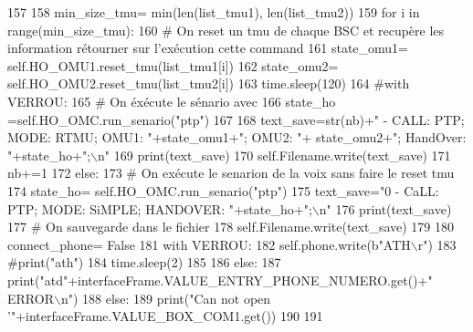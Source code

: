 \begin{DoxyCode}
157 
158                             min\_size\_tmu= min(len(list\_tmu1), len(list\_tmu2))
159                             \textcolor{keywordflow}{for} i \textcolor{keywordflow}{in} range(min\_size\_tmu):
160                                 \textcolor{comment}{# On reset un tmu de chaque BSC et recupère les information rétourner sur
       l'exécution cette command
}
161                                 state\_omu1= self.HO\_OMU1.reset\_tmu(list\_tmu1[i])
162                                 state\_omu2= self.HO\_OMU2.reset\_tmu(list\_tmu2[i])
163                                 time.sleep(120)
164                                 \textcolor{comment}{#with VERROU:
}
165                                 \textcolor{comment}{# On éxécute le sénario avec
}
166                                 state\_ho =self.HO\_OMC.run\_senario(\textcolor{stringliteral}{"ptp"})
167                                 
168                                 text\_save=str(nb)+\textcolor{stringliteral}{" - CALL: PTP; MODE: RTMU; OMU1: "}+state\_omu1+\textcolor{stringliteral}{"; OMU2: "}+
      state\_omu2+\textcolor{stringliteral}{"; HandOver: "}+state\_ho+\textcolor{stringliteral}{";\(\backslash\)n"}
169                                 print(text\_save)
170                                 self.Filename.write(text\_save)
171                             nb+=1
172                     \textcolor{keywordflow}{else}:
173                         \textcolor{comment}{# On exécute le senarion de la voix sans faire le reset tmu
}
174                         state\_ho= self.HO\_OMC.run\_senario(\textcolor{stringliteral}{"ptp"})
175                         text\_save=\textcolor{stringliteral}{"0 - CaLL: PTP; MODE: SiMPLE; HANDOVER: "}+state\_ho+\textcolor{stringliteral}{";\(\backslash\)n"}
176                         print(text\_save)
177                         \textcolor{comment}{# On sauvegarde dans le fichier
}
178                         self.Filename.write(text\_save)
179 
180                     connect\_phone= \textcolor{keyword}{False}
181                     with VERROU:
182                         self.phone.write(b\textcolor{stringliteral}{"ATH\(\backslash\)r"})
183                         \textcolor{comment}{#print("ath")
}
184                     time.sleep(2)
185 
186             \textcolor{keywordflow}{else}:
187                 print(\textcolor{stringliteral}{"atd"}+interfaceFrame.VALUE\_ENTRY\_PHONE\_NUMERO.get()+\textcolor{stringliteral}{" ERROR\(\backslash\)n"})
188         \textcolor{keywordflow}{else}:
189             print(\textcolor{stringliteral}{"Can not open '"}+interfaceFrame.VALUE\_BOX\_COM1.get())
190 
191 
\end{DoxyCode}
\mbox{\label{classScript_1_1handOver_1_1MobileTransmitter_aec021d2c9b7b289d100a056e21a730b8}} 

